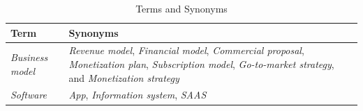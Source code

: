 \begin{table}[htbp]
    \caption{Terms and Synonyms}
    \label{tab:terms-synonyms}
    \centering
    \small
    \begin{tabular}{l|p{6cm}}
        \bottomrule
        \rowcolor{gray!50}
        \textbf{Term} & \textbf{Synonyms} \\
        \hline
        \textit{Business model} & \textit{Revenue model}, \textit{Financial model}, \textit{Commercial proposal}, \textit{Monetization plan}, \textit{Subscription model}, \textit{Go-to-market strategy}, and \textit{Monetization strategy} \\
        \textit{Software} & \textit{App}, \textit{Information system}, \textit{SAAS} \\
        \toprule
    \end{tabular}
\end{table}
